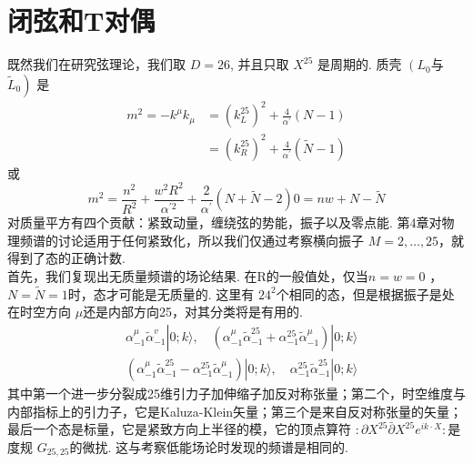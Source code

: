 \section{闭弦和T对偶}%
既然我们在研究弦理论，我们取 $D=26$, 并且只取 $X^{25}$ 是周期的. 质壳 $\left(L_{0}\right.$与$\left.\tilde{L}_{0}\right)$ 是
\begin{equation}
	\begin{aligned}
		m^{2}=-k^{\mu} k_{\mu} &=\left(k_{L}^{25}\right)^{2}+\frac{4}{\alpha^{\prime}}(N-1) \\
		&=\left(k_{R}^{25}\right)^{2}+\frac{4}{\alpha^{\prime}}(\tilde{N}-1)
	\end{aligned}
\end{equation}
或
\begin{subequations}
\begin{equation}
m^{2} =\frac{n^{2}}{R^{2}}+\frac{w^{2} R^{2}}{\alpha^{\prime 2}}+\frac{2}{\alpha^{\prime}}(N+\tilde{N}-2) 
\end{equation}
\begin{equation}
0 =n w+N-\tilde{N}
\end{equation}
\end{subequations}
对质量平方有四个贡献：紧致动量，缠绕弦的势能，振子以及零点能. 第4章对物理频谱的讨论适用于任何紧致化，所以我们仅通过考察横向振子 $M=2, \ldots, 25$，就得到了态的正确计数.\\
首先，我们复现出无质量频谱的场论结果. 在R的一般值处，仅当$n=w=0$ ， $N=\tilde{N}=1$时，态才可能是无质量的. 这里有 $24^{2}$个相同的态，但是根据振子是处在时空方向 $\mu$还是内部方向25，对其分类将是有用的.
\begin{equation}
	\begin{aligned}
		&\alpha_{-1}^{\mu} \tilde{\alpha}_{-1}^{v}|0 ; k\rangle, \quad\left(\alpha_{-1}^{\mu} \tilde{\alpha}_{-1}^{25}+\alpha_{-1}^{25} \tilde{\alpha}_{-1}^{\mu}\right)|0 ; k\rangle \\
		&\left(\alpha_{-1}^{\mu} \tilde{\alpha}_{-1}^{25}-\alpha_{-1}^{25} \tilde{\alpha}_{-1}^{\mu}\right)|0 ; k\rangle, \quad \alpha_{-1}^{25} \tilde{\alpha}_{-1}^{25}|0 ; k\rangle
	\end{aligned}
\end{equation}
其中第一个进一步分裂成25维引力子加伸缩子加反对称张量；第二个，时空维度与内部指标上的引力子，它是Kaluza-Klein矢量；第三个是来自反对称张量的矢量；最后一个态是标量，它是紧致方向上半径的模，它的顶点算符 $: \partial X^{25} \bar{\partial} X^{25} e^{i k \cdot X}:$是度规 $G_{25,25}$的微扰. 这与考察低能场论时发现的频谱是相同的.\\
